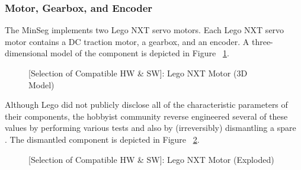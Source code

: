 \documentclass[crop=false,float=true,class=scrreprt]{standalone}
\begin{document}
\subsubsection{Motor, Gearbox, and Encoder}
\label{SEC:preliminaryDecisions:selectionHardwareSoftware:hardware:components:motor}

The MinSeg implements two Lego NXT servo motors.
Each Lego NXT servo motor contains a DC traction motor, a gearbox, and an encoder.
A three-dimensional model of the component is depicted in Figure~%
\ref{FIG:preliminaryDecisions:selectionHardwareSoftware:hardware:components:motor:3d}.

\vspace*{+1.0em}
\begin{figure}[H]%
\centering%
%
\caption[{[Selection of Compatible HW \& SW]: Lego NXT Motor (3D Model)}]%
        {{[Selection of Compatible HW \& SW]: Lego NXT Motor (3D Model)~%
           \cite{REF:online:philohome}%
           \label{FIG:preliminaryDecisions:selectionHardwareSoftware:hardware:components:motor:3d}%
        }}%
\end{figure}
\vspace*{-1.0em}

Although Lego did not publicly disclose all of the characteristic parameters of their components,
the hobbyist community reverse engineered several of these values by performing various tests
and also by (irreversibly) dismantling a spare~%
\cite{REF:online:philohome}.
The dismantled component is depicted in Figure~%
\ref{FIG:preliminaryDecisions:selectionHardwareSoftware:hardware:components:motor:exploded}.


\vspace*{+1.0em}
\begin{figure}[H]%
\centering%
%
\caption[{[Selection of Compatible HW \& SW]: Lego NXT Motor (Exploded)}]%
        {{[Selection of Compatible HW \& SW]: Lego NXT Motor (Exploded)~%
           \cite{REF:online:philohome}%
           \label{FIG:preliminaryDecisions:selectionHardwareSoftware:hardware:components:motor:exploded}%
           }}%
\end{figure}
\vspace*{-1.0em}




\clearpage
\end{document}
